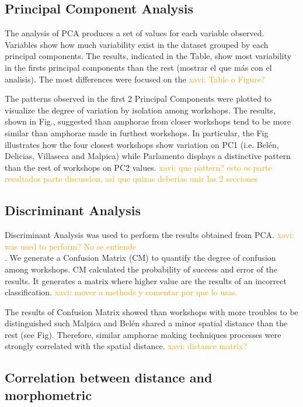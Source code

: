 \documentclass[review]{elsarticle}
\newcommand{\memo}[2]{\textcolor{#1}{#2}}
\newcommand{\xavi}[1]{\memo{orange}{xavi: #1\\}}
\begin{document}
\subsection{Principal Component Analysis}

The analysis of PCA produces a set of values for each variable observed. Variables show how much variability exist in the dataset grouped by each principal components. The results, indicated in the Table, show most variability in the firsts principal components than the rest (mostrar el que más con el analisis).
The most differences were focused on the %
\xavi{Table o Figure?}    

The patterns observed in the first 2 Principal Components were plotted to visualize the degree of variation by isolation among workshops. The results, shown in Fig., suggested than amphorae from closer workshops tend to be more similar than amphorae made in furthest workshops. In particular, the Fig illustrates how the four closest workshops show variation on PC1 (i.e. Belén, Delicias, Villaseca and Malpica) while Parlamento displays a distinctive pattern than the rest of workshops on PC2 values. 
\xavi{que pattern? esto es parte resultados parte discussion, asi que quizas deberias unir las 2 secciones}

\subsection{Discriminant Analysis}


Discriminant Analysis was used to perform the results obtained from PCA. \xavi{was used to perform? No se entiende}. We generate a Confusion Matrix (CM) to quantify the degree of confusion among workshops. CM calculated the probability of success and error of the results. It generates a matrix where higher value are the results of an incorrect classification. 
\xavi{mover a methods y comentar por que lo usas.}

The results of Confusion Matrix showed than workshops with more troubles to be distinguished such Malpica and Bel\'en shared a minor spatial distance than the rest (see Fig). Therefore, similar amphorae making techniques processes were strongly correlated with the spatial distance. 
\xavi{distance matrix?}

\subsection{Correlation between distance and morphometric}
\end{document}
